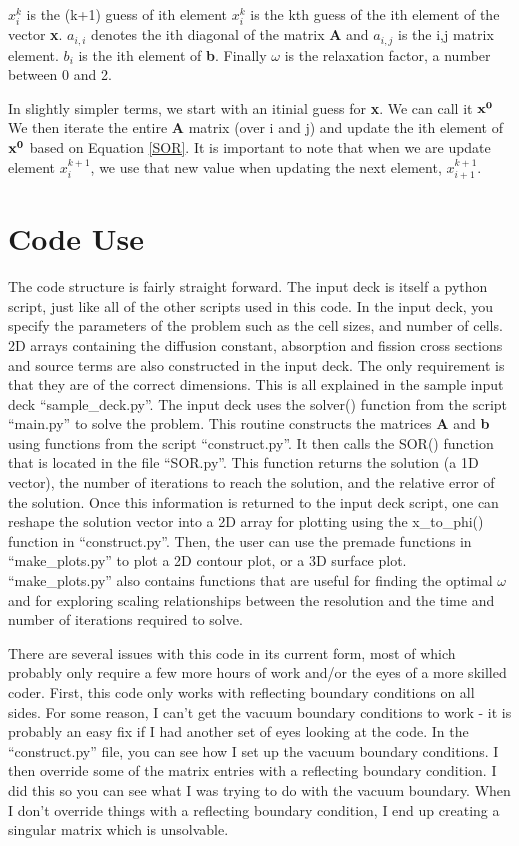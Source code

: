 \documentclass[a4paper,12pt]{article}
\begin{document}
$x_{i}^{k}$ is the (k+1) guess of ith element $x_{i}^{k}$ is the kth guess of the ith element of the vector {\bf x}. $a_{i,i}$ denotes the ith diagonal of the matrix {\bf A} and $a_{i,j}$ is the i,j matrix element. $b_{i}$ is the ith element of {\bf b}. Finally $\omega$ is the relaxation factor, a number between 0 and 2.

In slightly simpler terms, we start with an itinial guess for {\bf x}. We can call it { $\bf x^{0}$ } We then iterate the entire {\bf A} matrix (over i and j) and update the ith element of $\bf x^{0}$ based on Equation \ref{SOR}. It is important to note that when we are update element $x_{i}^{k+1}$, we use that new value when updating the next element, $x_{i+1}^{k+1}$.


\section{Code Use}\label{code use}
The code structure is fairly straight forward. The input deck is itself a python script, just like all of the other scripts used in this code. In the input deck, you specify the parameters of the problem such as the cell sizes, and number of cells. 2D arrays containing the diffusion constant, absorption and fission cross sections and source terms are also constructed in the input deck. The only requirement is that they are of the correct dimensions. This is all explained in the sample input deck ``sample\_deck.py''. The input deck uses the solver() function from the script ``main.py'' to solve the problem. This routine constructs the matrices {\bf A} and {\bf b} using functions from the script ``construct.py''. It then calls the SOR() function that is located in the file ``SOR.py''. This function returns the solution (a 1D vector), the number of iterations to reach the solution, and the relative error of the solution. Once this information is returned to the input deck script, one can reshape the solution vector into a 2D array for plotting using the x\_to\_phi() function in ``construct.py''. Then, the user can use the premade functions in ``make\_plots.py'' to plot a 2D contour plot, or a 3D surface plot. ``make\_plots.py'' also contains functions that are useful for finding the optimal $\omega$ and for exploring scaling relationships between the resolution and the time and number of iterations required to solve.

There are several issues with this code in its current form, most of which probably only require a few more hours of work and/or the eyes of a more skilled coder. First, this code only works with reflecting boundary conditions on all sides. For some reason, I can't get the vacuum boundary conditions to work - it is probably an easy fix if I had another set of eyes looking at the code. In the ``construct.py'' file, you can see how I set up the vacuum boundary conditions. I then override some of the matrix entries with a reflecting boundary condition. I did this so you can see what I was trying to do with the vacuum boundary. When I don't override things with a reflecting boundary condition, I end up creating a singular matrix which is unsolvable.
\end{document}
